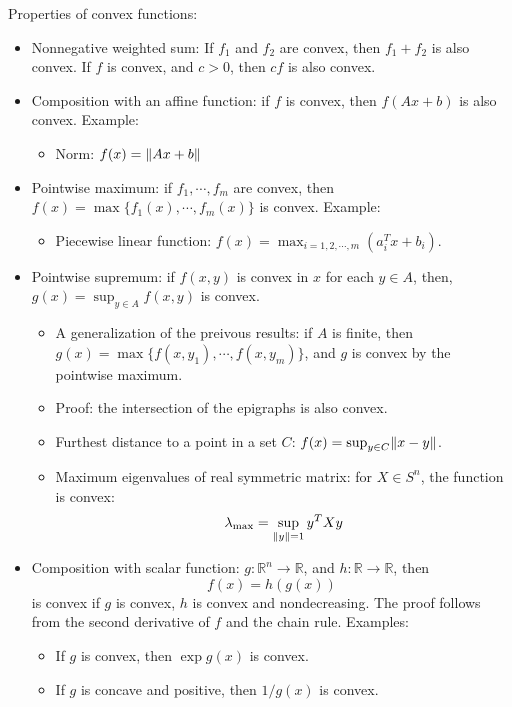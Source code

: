 \documentclass{report}
\begin{document}
Properties of convex functions: 
\begin{itemize}
\item Nonnegative weighted sum: If $f_1$ and $f_2$ are convex, then $f_1 + f_2$ is also convex. If $f$ is convex, and $c > 0$, then $cf$ is also convex. 

\item Composition with an affine function: if $f$ is convex, then $f(Ax + b)$ is also convex. Example: 
\begin{itemize}
	\item Norm: $f(x) = \lVert Ax + b\rVert$
\end{itemize}

\item Pointwise maximum: if $f_1, \cdots, f_m$ are convex, then $f(x) = \max \{f_1(x), \cdots, f_m(x)\}$ is convex. Example: 
\begin{itemize}
	\item Piecewise linear function: $f(x) = \max_{i = 1, 2, \cdots, m} (a_i^T x + b_i)$. 
\end{itemize}

\item Pointwise supremum: if $f(x,y)$ is convex in $x$ for each $y \in A$, then, $g(x) = \sup_{y \in A} f(x,y)$ is convex.  
\begin{itemize}
\item A generalization of the preivous results: if $A$ is finite, then $g(x) = \max \{f(x,y_1), \cdots, f(x,y_m)\}$, and $g$ is convex by the pointwise maximum. 
\item Proof: the intersection of the epigraphs is also convex. 
	\item Furthest distance to a point in a set $C$: $f(x) = \sup_{y \in C} \lVert x-y\rVert$. 
	\item Maximum eigenvalues of real symmetric matrix: for $X \in S^n$, the function is convex: 
\begin{equation}
\lambda_{\text{max}} = \sup_{\lVert y\rVert = 1} y^T X y	
\end{equation}
\end{itemize}

\item Composition with scalar function: $g: \mathbb{R}^n \rightarrow \mathbb{R}$, and $h: \mathbb{R} \rightarrow \mathbb{R}$, then 
\begin{equation}
f(x) = h(g(x))	
\end{equation}
is convex if $g$ is convex, $h$ is convex and nondecreasing. The proof follows from the second derivative of $f$ and the chain rule. Examples: 
\begin{itemize}
\item If $g$ is convex, then $\exp g(x)$ is convex. 
\item If $g$ is concave and positive, then $1/g(x)$ is convex. 
\end{itemize}


\end{itemize}
\end{document}
